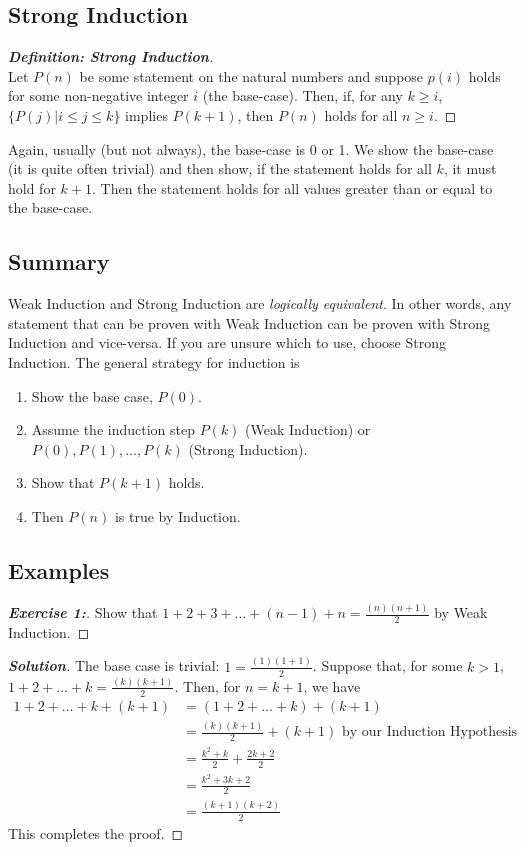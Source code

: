 \documentclass[a4paper]{article}
\newenvironment{solution}{\begin{proof}[\textnormal{\textbf{Solution}}]}{\end{proof}}
\newenvironment{exercise}[1]{\begin{proof}[\textnormal{\textbf{Exercise #1:}}]\phantom{\qedhere}}{\end{proof}}
\newenvironment{definition}[1]{\begin{proof}[\textnormal{\textbf{Definition: #1}}]\mbox{}\\\phantom{\qedhere}}{\end{proof}}
\theoremstyle{definition}
\begin{document}
 \subsection{Strong Induction}
  \begin{definition}{Strong Induction}
   Let $P(n)$ be some statement on the natural numbers and suppose $p(i)$ holds for some non-negative integer $i$ (the base-case). Then, if, for any $k\geq i$, $\{P(j)|i\leq j\leq k\}$ implies $P(k+1)$, then $P(n)$ holds for all $n\geq i$.
   \end{definition}
  
   Again, usually (but not always), the base-case is 0 or 1. We show the base-case (it is quite often trivial) and then show, if the statement holds for all $k$, it must hold for $k+1$. Then the statement holds for all values greater than or equal to the base-case. 
   
 \subsection{Summary}
 Weak Induction and Strong Induction are \textit{logically equivalent}. In other words, any statement that can be proven with Weak Induction can be proven with Strong Induction and vice-versa. If you are unsure which to use, choose Strong Induction. The general strategy for induction is
 \begin{enumerate}
  \item Show the base case, $P(0)$.
  \item Assume the induction step $P(k)$ (Weak Induction) or $P(0), P(1), \hdots, P(k)$ (Strong Induction).
  \item Show that $P(k+1)$ holds.
  \item Then $P(n)$ is true by Induction.
 \end{enumerate}
 
 \subsection{Examples}
 \begin{exercise}{1}
 Show that $1+2+3+\hdots+(n-1)+n=\frac{(n)(n+1)}{2}$ by Weak Induction.
  \end{exercise}
  \begin{solution}
   The base case is trivial: $1=\frac{(1)(1+1)}{2}$. Suppose that, for some $k>1$, $1+2+\hdots+k=\frac{(k)(k+1)}{2}$. Then, for $n=k+1$, we have 
   \begin{align*}1+2+\hdots+k+(k+1)&=(1+2+\hdots+k) + (k+1)\\
&=\frac{(k)(k+1)}{2}+(k+1)\text{ by our Induction Hypothesis}\\
&=\frac{k^2+k}{2}+\frac{2k+2}{2}\\&=\frac{k^2+3k+2}{2}\\&=\frac{(k+1)(k+2)}{2}
   \end{align*}
   This completes the proof.
  \end{solution}
\end{document}
